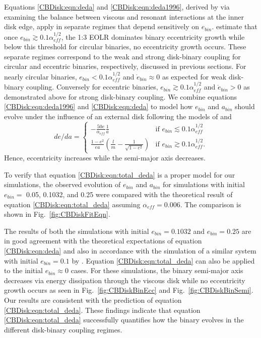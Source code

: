Equations \ref{CBDisk:eqn:deda} and \ref{CBDisk:eqn:deda1996}, derived by \citet{Artymowicz1996b} via examining the balance between viscous and resonant interactions at the inner 
disk edge, apply in separate regimes that depend sensitively on $e_{bin}$.  \citet{Artymowicz1996b} estimate that once $e_{bin} \gtrsim 0.1 \alpha_{eff}^{1/2}$, the 1:3 
EOLR dominates binary eccentricity growth while below this threshold for circular binaries, no eccentricity growth occurs.  These separate regimes correspond 
to the weak and strong disk-binary coupling for circular and eccentric binaries, respectively, discussed in previous sections.  For nearly circular binaries, 
$e_{bin} < 0.1 \alpha_{eff}^{1/2}$ and $\dot{e}_{bin} \approx 0$ as expected for weak disk-binary coupling.  Conversely for eccentric binaries, $e_{bin} \gtrsim 
0.1 \alpha_{eff}^{1/2}$ and $\dot{e}_{bin} > 0$ as demonstrated above for strong disk-binary coupling.  We combine equations \ref{CBDisk:eqn:deda1996} and 
\ref{CBDisk:eqn:deda} to model how $e_{bin}$ and $a_{bin}$ should evolve under the influence of an external disk following the models of \citet{Artymowicz1996b,Artymowicz2000} and 
\citet{Dermine2013}
\begin{equation}
\label{CBDisk:eqn:total_deda}
de/da=
\begin{cases}
-\frac{50e}{\alpha_{eff}}\frac{1}{a} & \text{if } e_{bin} \lesssim 0.1 \alpha_{eff}^{1/2}\\
\frac{1 - e^2}{ea} \left(\frac{l}{m} - \frac{1}{\sqrt{1 - e^2}}\right) & \text{if } e_{bin} \gtrsim 0.1 \alpha_{eff}^{1/2}.
\end{cases}
\end{equation}
Hence, eccentricity increases while the semi-major axis decreases.

To verify that equation \ref{CBDisk:eqn:total_deda} is a proper model for our simulations, the observed evolution of $e_{bin}$ and $a_{bin}$ for simulations with initial $e_{bin} =$ 0.05, 0.1032, and 0.25 were compared with the theoretical result of equation \ref{CBDisk:eqn:total_deda} assuming $\alpha_{eff} = 0.006$.  The comparison is shown in Fig.~\ref{fig:CBDiskFitEqn}.

The results of both the simulations with initial $e_{bin} = 0.1032$ and $e_{bin} = 0.25$ are in good agreement with the theoretical expectations of equation \ref{CBDisk:eqn:deda} and also in accordance with the simulation of a similar system with initial $e_{bin} = 0.1$ by \citet{Artymowicz1991}.  Equation \ref{CBDisk:eqn:total_deda} can also be applied to the initial $e_{bin} \approx 0$ cases.  For these simulations, the binary semi-major axis decreases via energy dissipation through the viscous disk while no eccentricity growth occurs as seen in Fig.~\ref{fig:CBDiskBinEcc} and Fig.~\ref{fig:CBDiskBinSemi}.  Our results are consistent with the prediction of equation \ref{CBDisk:eqn:total_deda}.  These findings indicate that equation \ref{CBDisk:eqn:total_deda} successfully quantifies how the binary evolves in the different disk-binary coupling regimes.

